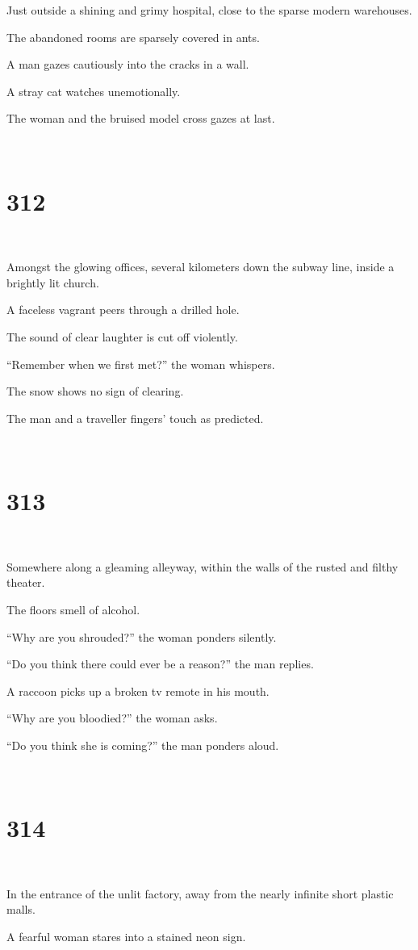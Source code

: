 \documentclass{report}
\begin{document}
Just outside a shining and grimy hospital, close to the sparse modern warehouses.

The abandoned rooms are sparsely covered in ants.

A man gazes cautiously into the cracks in a wall.

A stray cat watches unemotionally.

The woman and the bruised model cross gazes at last.

~
\chapter*{312}
~

Amongst the glowing offices, several kilometers down the subway line, inside a brightly lit church.

A faceless vagrant peers through a drilled hole.

The sound of clear laughter is cut off violently.

``Remember when we first met?'' the woman whispers.

The snow shows no sign of clearing.

The man and a traveller fingers' touch as predicted.

~
\chapter*{313}
~

Somewhere along a gleaming alleyway, within the walls of the rusted and filthy theater.

The floors smell of alcohol.

``Why are you shrouded?'' the woman ponders silently.

``Do you think there could ever be a reason?'' the man replies.

A raccoon picks up a broken tv remote in his mouth.

``Why are you bloodied?'' the woman asks.

``Do you think she is coming?'' the man ponders aloud.

~
\chapter*{314}
~

In the entrance of the unlit factory, away from the nearly infinite short plastic malls.

A fearful woman stares into a stained neon sign.
\end{document}
